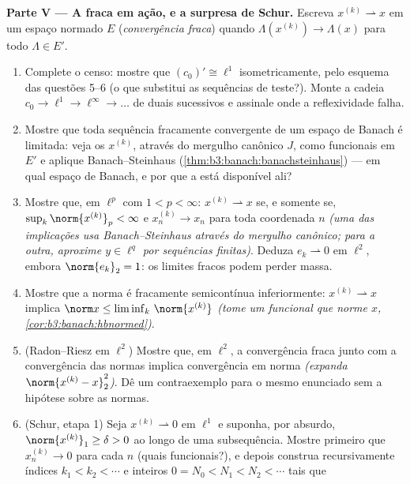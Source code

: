 \begin{problem}[{Problema de fim de semana --- $(\ell^p)' = \ell^q$, reflexividade e a
estranheza de $\ell^\infty$}]
\medskip
\noindent\textbf{Parte V --- A  fraca em ação, e a surpresa
de Schur.} Escreva $x^{(k)} \rightharpoonup x$ em um espaço normado $E$
(\emph{convergência fraca}) quando $\Lambda(x^{(k)}) \to \Lambda(x)$ para todo $\Lambda \in E'$.
\begin{enumerate}[resume]
  \item Complete o censo: mostre que $(c_0)' \cong \ell^1$ isometricamente, pelo
        esquema das questões 5--6 (o que substitui as sequências de
        teste?). Monte a cadeia $c_0 \to \ell^1 \to \ell^\infty \to \dots$ de duais sucessivos e assinale
        onde a reflexividade falha.
  \item Mostre que toda sequência fracamente convergente de um espaço
        de Banach é limitada: veja os $x^{(k)}$, através do mergulho
        canônico $J$, como funcionais em $E'$ e aplique
        Banach--Steinhaus (\cref{thm:b3:banach:banachsteinhaus}) --- em qual espaço de Banach,
        e por que a  está disponível ali?
  \item Mostre que, em $\ell^p$ com $1 < p < \infty$: $x^{(k)}
        \rightharpoonup x$ se, e somente se,
        $\sup_k\norm{x^{(k)}}_p <
        \infty$ e $x^{(k)}_n \to x_n$ para toda coordenada $n$ \emph{(uma das
        implicações usa Banach--Steinhaus através do mergulho
        canônico; para a outra, aproxime $y
        \in \ell^q$ por sequências finitas)}.
        Deduza $e_k
        \rightharpoonup 0$ em $\ell^2$, embora $\norm{e_k}_2 =
        1$: os limites fracos
        podem perder massa.
  \item Mostre que a norma é fracamente semicontínua inferiormente:
        $x^{(k)} \rightharpoonup x$ implica $\norm x \leq
        \liminf_k\,\norm{x^{(k)}}$ \emph{(tome um funcional que norme $x$,
        \cref{cor:b3:banach:hbnormed})}.
  \item (Radon--Riesz em $\ell^2$) Mostre que, em $\ell^2$, a
        convergência fraca junto com a convergência das normas implica
        convergência em norma \emph{(expanda $\norm{x^{(k)} -
        x}_2^2$)}. Dê um
        contraexemplo para o mesmo enunciado sem a hipótese sobre as
        normas.
  \item (Schur, etapa 1) Seja $x^{(k)} \rightharpoonup 0$ em $\ell^1$ e suponha, por
        absurdo, $\norm{x^{(k)}}_1 \geq \delta > 0$ ao longo de uma subsequência. Mostre primeiro
        que $x^{(k)}_n \to 0$ para cada $n$ (quais funcionais?), e depois
        construa recursivamente índices $k_1 < k_2 < \cdots$ e inteiros $0 = N_0 < N_1 < N_2 < \cdots$ tais que

\end{enumerate}
\end{problem}
